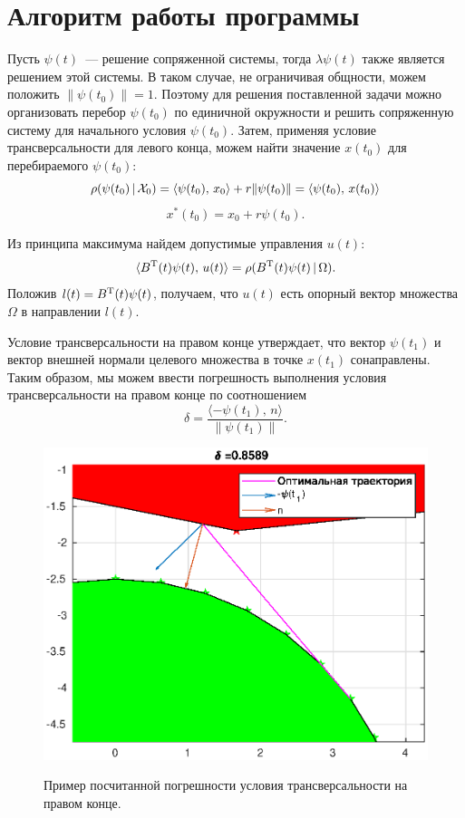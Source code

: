 \section{Алгоритм работы программы}

Пусть $\psi(t)$~--- решение сопряженной системы, тогда $\lambda\psi(t)$ также является решением этой системы. В таком случае, не ограничивая общности, можем положить $\|\psi(t_0)\| = 1$. Поэтому для решения поставленной задачи можно организовать перебор $\psi(t_0)$ по единичной окружности и решить сопряженную систему для начального условия $\psi(t_0)$. Затем, применяя условие трансверсальности для левого конца, можем найти значение $x(t_0)$ для перебираемого $\psi(t_0)$:
$$
        \rho(\psi(t_0)\,|\,\mathcal{X}_0) = \langle\psi(t_0),\,x_0\rangle + r\|\psi(t_0)\| = \langle\psi(t_0),\,x(t_0)\rangle
$$
$$
        x^*(t_0) = x_0 + r\psi(t_0). 
$$

Из принципа максимума найдем допустимые управления $u(t)$:
$$
        \langle B^{\mathrm{T}}(t)\psi(t),\,u(t)\rangle = \rho(B^{\mathrm{T}}(t)\psi(t)\,|\,\Omega).
$$
Положив $l(t) = B^{\mathrm{T}}(t)\psi(t)$, получаем, что $u(t)$ есть опорный вектор множества $\Omega$ в направлении $l(t)$.

Условие трансверсальности на правом конце утверждает, что вектор $\psi(t_1)$ и вектор внешней нормали целевого множества в точке $x(t_1)$ сонаправлены. Таким образом, мы можем ввести погрешность выполнения условия трансверсальности на правом конце по соотношением
$$
        \delta = \frac{\langle-\psi(t_1),\,n\rangle}{\|\psi(t_1)\|}.
$$
\begin{figure}[h]
        \noindent
        \centering
        {
                \includegraphics[width=120mm]{algorithm/transvers.eps}
        }
        \caption{Пример посчитанной погрешности условия трансверсальности на правом конце.}
\end{figure}

